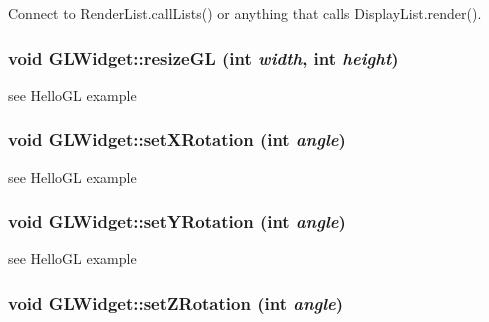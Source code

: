 Connect to RenderList.callLists() or anything that calls DisplayList.render(). \hypertarget{class_g_l_widget_ac0d2a8ecf60907a81c0d73475d851025}{
\subsubsection[{resizeGL}]{\setlength{\rightskip}{0pt plus 5cm}void GLWidget::resizeGL (int {\em width}, \/  int {\em height})}}
\label{class_g_l_widget_ac0d2a8ecf60907a81c0d73475d851025}


see HelloGL example \hypertarget{class_g_l_widget_a7083404e9ab8feffb2c486f7c15308ce}{
\subsubsection[{setXRotation}]{\setlength{\rightskip}{0pt plus 5cm}void GLWidget::setXRotation (int {\em angle})}}
\label{class_g_l_widget_a7083404e9ab8feffb2c486f7c15308ce}


see HelloGL example \hypertarget{class_g_l_widget_a29012eba3cb4201f78807066f2c9dcd4}{
\subsubsection[{setYRotation}]{\setlength{\rightskip}{0pt plus 5cm}void GLWidget::setYRotation (int {\em angle})}}
\label{class_g_l_widget_a29012eba3cb4201f78807066f2c9dcd4}


see HelloGL example \hypertarget{class_g_l_widget_a6f6b4fbbcc566d999db7e53aadeba889}{
\subsubsection[{setZRotation}]{\setlength{\rightskip}{0pt plus 5cm}void GLWidget::setZRotation (int {\em angle})}}
\label{class_g_l_widget_a6f6b4fbbcc566d999db7e53aadeba889}


